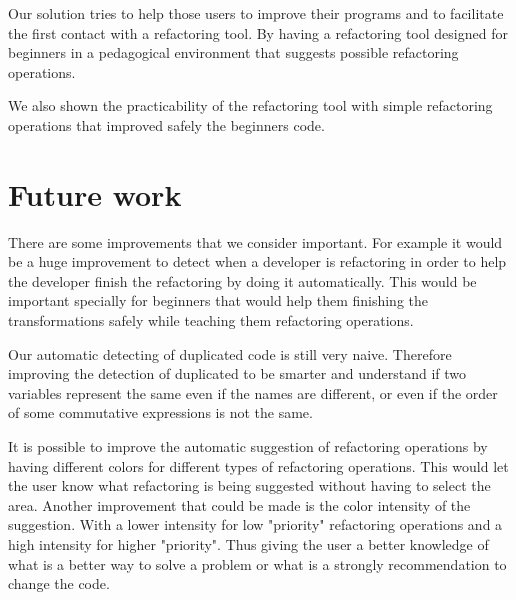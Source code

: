 Our solution tries to help those users to improve their programs and to facilitate
the first contact with a refactoring tool.
By having a refactoring tool designed for beginners in a pedagogical environment
that suggests possible refactoring operations.

We also shown the practicability of the refactoring tool with simple refactoring operations
that improved safely the beginners code.


\section{Future work}
There are some improvements that we consider important. For example it would  %
be a huge improvement to detect when a developer is refactoring in order to help the developer finish the
refactoring by doing it automatically.
This would be important specially for beginners that would help them finishing
the transformations safely while teaching them refactoring operations. %

Our automatic detecting of duplicated code is still very naive.
Therefore improving the detection of duplicated to be smarter and understand if
two variables represent the same even if the names are different, or even if the
 order of some commutative expressions is not the same.



It is possible to improve the automatic suggestion of refactoring operations by
having different colors for different types of refactoring operations.
This would let the user know what refactoring is being suggested without having to
select the area.
Another improvement that could be made is the color intensity of the suggestion.
With a lower intensity for low "priority" refactoring operations and a high intensity
for higher "priority". Thus giving the user a better knowledge of what is a better
way to solve a problem or what is a strongly recommendation to change the code.

